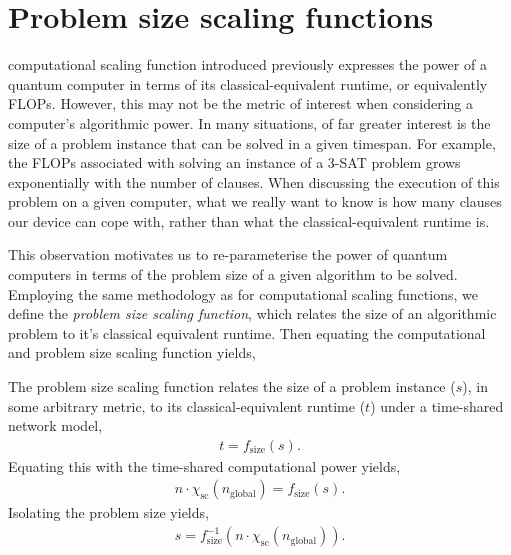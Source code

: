 %
%

\section{Problem size scaling functions}\label{sec:prob_sc_func}

 computational scaling function introduced previously expresses the power of a quantum computer in terms of its classical-equivalent runtime, or equivalently FLOPs. However, this may not be the metric of interest when considering a computer's algorithmic power. In many situations, of far greater interest is the size of a problem instance that can be solved in a given timespan. For example, the FLOPs associated with solving an instance of a 3-\textsc{SAT} problem grows exponentially with the number of clauses. When discussing the execution of this problem on a given computer, what we really want to know is how many clauses our device can cope with, rather than what the classical-equivalent runtime is.

This observation motivates us to re-parameterise the power of quantum computers in terms of the problem size of a given algorithm to be solved. Employing the same methodology as for computational scaling functions, we define the \textit{problem size scaling function}, which relates the size of an algorithmic problem to it's classical equivalent runtime. Then equating the computational and problem size scaling function yields,

\begin{definition}
The problem size scaling function relates the size of a problem instance ($s$), in some arbitrary metric, to its classical-equivalent runtime ($t$) under a time-shared network model,
\begin{align}
t = f_\mathrm{size}(s).
\end{align}
Equating this with the time-shared computational power yields,
\begin{align}
	n\cdot \chi_\mathrm{sc}(n_\mathrm{global}) = f_\mathrm{size}(s).
\end{align}
Isolating the problem size yields,
\begin{align}
s = f_\mathrm{size}^{-1}(n\cdot \chi_\mathrm{sc}(n_\mathrm{global})).
\end{align}
\end{definition}

